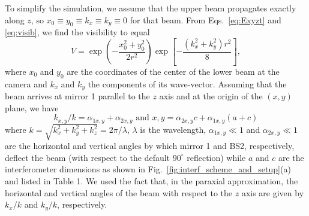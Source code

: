 To simplify the simulation, we assume that  the upper beam propagates exactly along $z$, so $x_0\equiv y_0\equiv k_x\equiv k_y\equiv 0$ for that beam. From Eqs.~\eqref{eq:Exyzt} and \eqref{eq:visib}, we find the visibility to equal 
\begin{equation}
    V = \exp\left(- \frac{x_0^2 + y_0^2}{2 r^2}\right)  \exp\left[- \frac{(k_x^2 + k_y^2) r^2}{8}\right],
    \label{eq:visib_rot}
\end{equation}
where $x_0$ and $y_0$ are the coordinates of the center of the lower beam at the camera and $k_x$ and $k_y$ the components of its wave-vector. %
Assuming that the beam arrives at mirror 1 parallel to the $z$ axis and at the origin of the $(x,y)$ plane, we have 
\begin{equation}
k_{x,y}/k= \alpha_{1x,y} +  \alpha_{2x,y} \textrm{ and }x,y= \alpha_{2x,y} c +  \alpha_{1x,y} (a + c)\label{eq:xykxky}
\end{equation}
where $k=\sqrt{k_x^2+k_y^2+k_z^2}=2\pi/\lambda$, $\lambda$ is the wavelength, $\alpha_{1x,y}\ll1$ and  $\alpha_{2x,y}\ll1$ are the horizontal and vertical angles by which mirror 1 and BS2, respectively, deflect the beam (with respect to the default $90^\circ$ reflection) while $a$ and $c$ are the interferometer dimensions as shown in Fig.~\ref{fig:interf_scheme_and_setup}(a) and listed in Table 1. We used the fact that, in the paraxial approximation, the horizontal and vertical angles of the beam with respect to the $z$ axis are given by $k_x/k$ and $k_y/k$, respectively.

